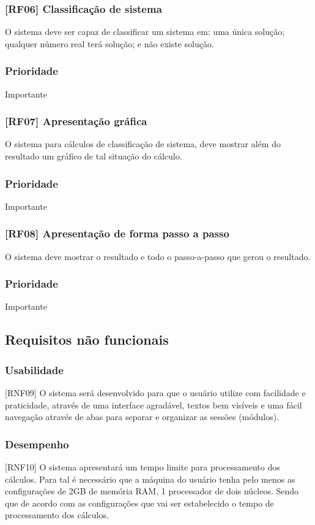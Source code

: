 \documentclass{scrreprt}
\begin{document}
\subsubsection{[RF06] Classificação de sistema}
O sistema deve ser capaz de classificar um sistema em: uma única solução; qualquer número real terá solução; e não existe solução.
\subsubsection{Prioridade}
Importante

\subsubsection{[RF07] Apresentação gráfica}
O sistema para cálculos de classificação de sistema, deve mostrar além do resultado um gráfico de tal situação do cálculo.
\subsubsection{Prioridade}
Importante

\subsubsection{[RF08] Apresentação de forma passo a passo}
O sistema deve mostrar o resultado e todo o passo-a-passo que gerou o resultado.
\subsubsection{Prioridade}
Importante

\subsection{Requisitos não funcionais}

\subsubsection{Usabilidade}
[RNF09] O sistema será desenvolvido para que o usuário utilize com facilidade e praticidade, através de uma interface agradável, textos bem visíveis e uma fácil navegação através de abas para separar e organizar as sessões (módulos). 

\subsubsection{Desempenho}
[RNF10] O sistema apresentará um tempo limite para processamento dos cálculos. Para tal é necessário que a máquina do usuário tenha pelo menos as configurações de 2GB de memória RAM, 1 processador de dois núcleos. Sendo que de acordo com as configurações que vai ser estabelecido o tempo de processamento dos cálculos.
\end{document}
